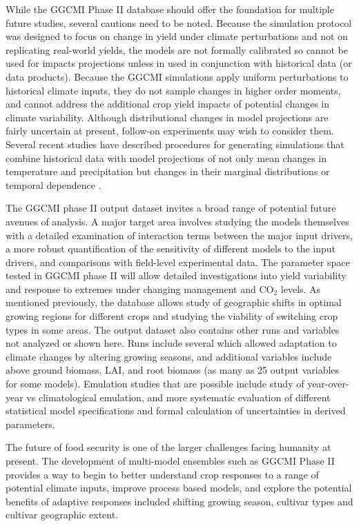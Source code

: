 \documentclass[preprint, 5p, times, twocolumn]{elsarticle}
\begin{document}
While the GGCMI Phase II database should offer the foundation for multiple future studies, several cautions need to be noted. Because the simulation protocol was designed to focus on change in yield under climate perturbations and not on replicating real-world yields, the models are not formally calibrated so cannot be used for impacts projections unless in used in conjunction with historical data (or data products). Because the GGCMI simulations apply uniform perturbations to historical climate inputs, they do not sample changes in higher order moments, and cannot address the additional crop yield impacts of potential changes in climate variability. Although distributional changes in model projections are fairly uncertain at present, follow-on experiments may wish to consider them. Several recent studies have described procedures for generating simulations that combine historical data with model projections of not only mean changes in temperature and precipitation but changes in their marginal distributions \citep[e.g.][]{Won16} or temporal dependence \citep[e.g.][]{Leeds2015}.

The GGCMI phase II output dataset invites a broad range of potential future avenues of analysis. A major target area involves studying the models themselves with a detailed examination of interaction terms between the major input drivers, a more robust quantification of the sensitivity of different models to the input drivers, and comparisons with field-level experimental data. The parameter space tested in GGCMI phase II will allow detailed investigations into yield variability and response to extremes under changing management and CO$_2$ levels. As mentioned previously, the database allows study of geographic shifts in optimal growing regions for different crops and studying the viability of switching crop types in some areas. The output dataset also contains other runs and variables not analyzed or shown here. Runs include several which allowed adaptation to climate changes by altering growing seasons, and additional variables include above ground biomass, LAI, and root biomass (as many as 25 output variables for some models). Emulation studies that are possible include study of year-over-year vs climatological emulation, and more systematic evaluation of different statistical model specifications and formal calculation of uncertainties in derived parameters.

The future of food security is one of the larger challenges facing humanity at present. The development of multi-model ensembles such as GGCMI Phase II provides a way to begin to better understand crop responses to a range of potential climate inputs, improve process based models, and explore the potential benefits of adaptive responses included shifting growing season, cultivar types and cultivar geographic extent.
\end{document}
